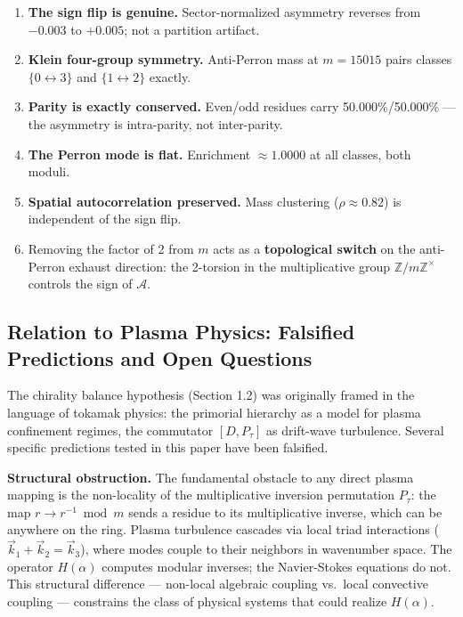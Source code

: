 \documentclass[11pt,letterpaper]{article}
\theoremstyle{definition}
\theoremstyle{remark}
\begin{document}
\begin{enumerate}
\item
  \textbf{The sign flip is genuine.} Sector-normalized asymmetry reverses from $-0.003$ to $+0.005$; not a partition artifact.
\item
  \textbf{Klein four-group symmetry.} Anti-Perron mass at $m = 15015$ pairs classes $\{0 \leftrightarrow 3\}$ and $\{1 \leftrightarrow 2\}$ exactly.
\item
  \textbf{Parity is exactly conserved.} Even/odd residues carry 50.000\%/50.000\% --- the asymmetry is intra-parity, not inter-parity.
\item
  \textbf{The Perron mode is flat.} Enrichment $\approx 1.0000$ at all classes, both moduli.
\item
  \textbf{Spatial autocorrelation preserved.} Mass clustering ($\rho \approx 0.82$) is independent of the sign flip.
\item
  Removing the factor of 2 from $m$ acts as a \textbf{topological switch} on the anti-Perron exhaust direction: the 2-torsion in the multiplicative group $\mathbb{Z}/m\mathbb{Z}^\times$ controls the sign of $\mathcal{A}$.
\end{enumerate}

\subsection{Relation to Plasma Physics: Falsified Predictions and Open Questions}\label{relation-to-plasma-physics-falsified-predictions-and-open-questions}

The chirality balance hypothesis (Section 1.2) was originally framed in the language of tokamak physics: the primorial hierarchy as a model for plasma confinement regimes, the commutator $[D, P_\tau]$ as drift-wave turbulence. Several specific predictions tested in this paper have been falsified.

\textbf{Structural obstruction.} The fundamental obstacle to any direct plasma mapping is the non-locality of the multiplicative inversion permutation $P_\tau$: the map $r \to r^{-1} \bmod m$ sends a residue to its multiplicative inverse, which can be anywhere on the ring. Plasma turbulence cascades via local triad interactions ($\vec{k}_1 + \vec{k}_2 = \vec{k}_3$), where modes couple to their neighbors in wavenumber space. The operator $H(\alpha)$ computes modular inverses; the Navier-Stokes equations do not. This structural difference --- non-local algebraic coupling vs.~local convective coupling --- constrains the class of physical systems that could realize $H(\alpha)$.
\end{document}
